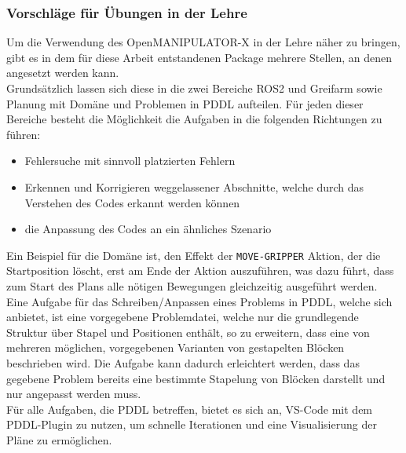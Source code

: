 \subsubsection{Vorschläge für Übungen in der Lehre}
Um die Verwendung des OpenMANIPULATOR-X in der Lehre näher zu bringen, gibt es in dem für diese Arbeit entstandenen Package mehrere Stellen, an denen angesetzt werden kann.\\
Grundsätzlich lassen sich diese in die zwei Bereiche \ac{ROS2} und Greifarm sowie Planung mit Domäne und Problemen in \ac{PDDL} aufteilen.
Für jeden dieser Bereiche besteht die Möglichkeit die Aufgaben in die folgenden Richtungen zu führen:
\begin{itemize}
\item Fehlersuche mit sinnvoll platzierten Fehlern
\item Erkennen und Korrigieren weggelassener Abschnitte, welche durch das Verstehen des Codes erkannt werden können
\item die Anpassung des Codes an ein ähnliches Szenario
\end{itemize}
Ein Beispiel für die Domäne ist, den Effekt der \verb|MOVE-GRIPPER| Aktion, der die Startposition löscht, erst am Ende der Aktion auszuführen, was dazu führt, dass zum Start des Plans alle nötigen Bewegungen gleichzeitig ausgeführt werden.\\
Eine Aufgabe für das Schreiben/Anpassen eines Problems in PDDL, welche sich anbietet, ist eine vorgegebene Problemdatei, welche nur die grundlegende Struktur über Stapel und Positionen enthält, so zu erweitern, dass eine von mehreren möglichen, vorgegebenen Varianten von gestapelten Blöcken beschrieben wird.
Die Aufgabe kann dadurch erleichtert werden, dass das gegebene Problem bereits eine bestimmte Stapelung von Blöcken darstellt und nur angepasst werden muss.\\
Für alle Aufgaben, die \ac{PDDL} betreffen, bietet es sich an, VS-Code mit dem PDDL-Plugin zu nutzen, um schnelle Iterationen und eine Visualisierung der Pläne zu ermöglichen.